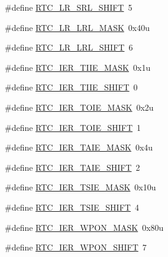 \begin{DoxyCompactItemize}
$$\item 
\#define \hyperlink{group___r_t_c___register___masks_ga33823f8e5a5e100db14493426af60d67}{R\+T\+C\+\_\+\+L\+R\+\_\+\+S\+R\+L\+\_\+\+S\+H\+I\+FT}~5
\item 
\#define \hyperlink{group___r_t_c___register___masks_gaf57761c6f1eb820b0d6764ae63e7dfcf}{R\+T\+C\+\_\+\+L\+R\+\_\+\+L\+R\+L\+\_\+\+M\+A\+SK}~0x40u
\item 
\#define \hyperlink{group___r_t_c___register___masks_ga723a045710e5df92a5bf5363e8cea08f}{R\+T\+C\+\_\+\+L\+R\+\_\+\+L\+R\+L\+\_\+\+S\+H\+I\+FT}~6
\item 
\#define \hyperlink{group___r_t_c___register___masks_ga4401cd4dce34a638f75403a2a3701e6d}{R\+T\+C\+\_\+\+I\+E\+R\+\_\+\+T\+I\+I\+E\+\_\+\+M\+A\+SK}~0x1u
\item 
\#define \hyperlink{group___r_t_c___register___masks_ga2938c56e7566549f7434b8f02ad6d478}{R\+T\+C\+\_\+\+I\+E\+R\+\_\+\+T\+I\+I\+E\+\_\+\+S\+H\+I\+FT}~0
\item 
\#define \hyperlink{group___r_t_c___register___masks_ga1dfc25308bec00f67925ae796f805d3d}{R\+T\+C\+\_\+\+I\+E\+R\+\_\+\+T\+O\+I\+E\+\_\+\+M\+A\+SK}~0x2u
\item 
\#define \hyperlink{group___r_t_c___register___masks_gaf9355764ec83dde6e2890f391a469856}{R\+T\+C\+\_\+\+I\+E\+R\+\_\+\+T\+O\+I\+E\+\_\+\+S\+H\+I\+FT}~1
\item 
\#define \hyperlink{group___r_t_c___register___masks_gad1bcc4df9a637ec5ab4b611391986c06}{R\+T\+C\+\_\+\+I\+E\+R\+\_\+\+T\+A\+I\+E\+\_\+\+M\+A\+SK}~0x4u
\item 
\#define \hyperlink{group___r_t_c___register___masks_gae15cd7098592da4c3a2c2563879ae5d8}{R\+T\+C\+\_\+\+I\+E\+R\+\_\+\+T\+A\+I\+E\+\_\+\+S\+H\+I\+FT}~2
\item 
\#define \hyperlink{group___r_t_c___register___masks_ga63c8ae5db82845d5bb13907cd0e70cd7}{R\+T\+C\+\_\+\+I\+E\+R\+\_\+\+T\+S\+I\+E\+\_\+\+M\+A\+SK}~0x10u
\item 
\#define \hyperlink{group___r_t_c___register___masks_ga456ec6fb31112c122b38dcc586d9e75d}{R\+T\+C\+\_\+\+I\+E\+R\+\_\+\+T\+S\+I\+E\+\_\+\+S\+H\+I\+FT}~4
\item 
\#define \hyperlink{group___r_t_c___register___masks_gae08d5bcb3d71bb932a7c1d41086b3545}{R\+T\+C\+\_\+\+I\+E\+R\+\_\+\+W\+P\+O\+N\+\_\+\+M\+A\+SK}~0x80u
\item 
\#define \hyperlink{group___r_t_c___register___masks_gaa18422218526a3bb50a3158c3aee2100}{R\+T\+C\+\_\+\+I\+E\+R\+\_\+\+W\+P\+O\+N\+\_\+\+S\+H\+I\+FT}~7
\end{DoxyCompactItemize}


